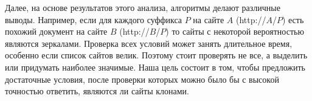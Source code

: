 Далее, на основе результатов этого анализа, алгоритмы делают различные выводы.
Например, если для каждого суффикса $P$ на сайте $A$ (http://$A$/$P$) есть похожий
документ на сайте $B$ (http://$B$/$P$) то сайты с некоторой вероятностью являются зеркалами. Проверка всех
условий может занять длительное время, особенно если список сайтов велик.
Поэтому стоит проверять не все, а выделить или придумать наиболее значимые. Наша
цель состоит в том, чтобы предложить достаточные условия, после проверки которых
можно было бы с высокой точностью ответить, являются ли сайты клонами. 
